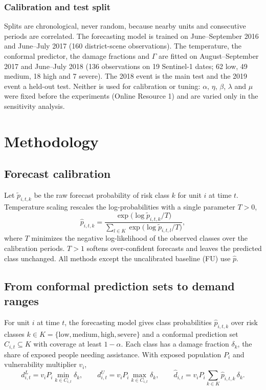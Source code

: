 \documentclass[pdflatex,sn-basic]{sn-jnl}
\theoremstyle{plain}%
\theoremstyle{remark}%
\theoremstyle{definition}%
\begin{document}
\subsubsection{Calibration and test split}
 Splits are chronological, never random, because nearby units and consecutive periods are correlated. The forecasting model is trained on June--September 2016 and June--July 2017 (160 district-scene observations). The temperature, the conformal predictor, the damage fractions and $\Gamma$ are fitted on August--September 2017 and June--July 2018 (136 observations on 19 Sentinel-1 dates; 62 low, 49 medium, 18 high and 7 severe). The 2018 event is the main test and the 2019 event a held-out test. Neither is used for calibration or tuning: $\alpha$, $\eta$, $\beta$, $\lambda$ and $\mu$ were fixed before the experiments (Online Resource 1) and are varied only in the sensitivity analysis.

\section{Methodology}\label{sec:method}

\subsection{Forecast calibration}\label{sec:calib}

Let $\tilde p_{i,t,k}$ be the raw forecast probability of risk class $k$ for unit $i$ at time $t$. Temperature scaling \citep{Guo2017} rescales the log-probabilities with a single parameter $T>0$,
\begin{equation}
\hat p_{i,t,k} = \frac{\exp\!\big(\log \tilde p_{i,t,k}/T\big)}{\sum_{l \in K}\exp\!\big(\log \tilde p_{i,t,l}/T\big)},
\label{eq:temp}
\end{equation}
where $T$ minimizes the negative log-likelihood of the observed classes over the calibration periods. $T>1$ softens over-confident forecasts and leaves the predicted class unchanged. All methods except the uncalibrated baseline (FU) use $\hat p$.

\subsection{From conformal prediction sets to demand ranges}\label{sec:bridge}

For unit $i$ at time $t$, the forecasting model gives class probabilities $\hat p_{i,t,k}$ over risk classes $k \in K = \{\text{low}, \text{medium}, \text{high}, \text{severe}\}$ and a conformal prediction set $C_{i,t} \subseteq K$ with coverage at least $1-\alpha$. Each class has a damage fraction $\delta_k$, the share of exposed people needing assistance. With exposed population $P_i$ and vulnerability multiplier $v_i$,
\begin{equation}
d^{L}_{i,t} = v_i P_i \min_{k \in C_{i,t}} \delta_k, \qquad
d^{U}_{i,t} = v_i P_i \max_{k \in C_{i,t}} \delta_k, \qquad
\hat d_{i,t} = v_i P_i \sum_{k \in K} \hat p_{i,t,k}\, \delta_k .
\label{eq:bridge}
\end{equation}
\end{document}
